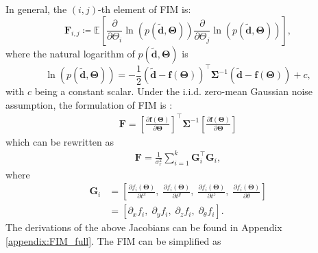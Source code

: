 \documentclass[journal]{IEEEtran}
\def\CovMatR{\mathbf{\Sigma}}
\def\StateVector{\mathbf{\Theta}}
\def\FIM{\mathbf{F}}
\begin{document}
In general, the $(i,j)$-th element of FIM is:
\begin{equation}
    \FIM_{i,j} \coloneqq \mathbb{E}\left[
    \frac{\partial}{\partial \Theta_i}\ln \left( p(\tilde{\mathbf{d}}, \StateVector) \right)
    \frac{\partial}{\partial \Theta_j}\ln \left( p(\tilde{\mathbf{d}}, \StateVector) \right)
    \right],
\end{equation}
where the natural logarithm of $p(\tilde{\mathbf{d}}, \StateVector)$ is \begin{equation}
    \ln \left( p(\tilde{\mathbf{d}}, \StateVector) \right) = - \frac{1}{2} (\tilde{\mathbf{d}} - \mathbf{f}(\StateVector))^\top \CovMatR^{-1} (\tilde{\mathbf{d}} - \mathbf{f}(\StateVector)) + c,
\end{equation}
with $c$ being a constant scalar. Under the i.i.d. zero-mean Gaussian noise assumption, the formulation of FIM is \cite{zekavat2011handbook}:
\begin{equation}
\begin{aligned}
    \FIM = 
    \left[ \frac{\partial \mathbf{f}(\StateVector)}{\partial \StateVector} \right]^\top 
    \CovMatR^{-1} 
    \left[ \frac{\partial \mathbf{f}(\StateVector)}{\partial \StateVector} \right]
\end{aligned}
\end{equation}
which can be rewritten as
{\color{black}
\begin{equation}
\begin{aligned}
    \FIM = 
    \frac{1}{\sigma_r^2}
    \sum\limits_{i=1}^{k}
    \mathbf{G}_i^\top \mathbf{G}_i,
\end{aligned}
\end{equation}
}
where%
\begin{equation} \label{eq:G_i_orginial}
\begin{aligned}
    \mathbf{G}_i &= \left[
        \frac{\partial f_i(\StateVector)}{\partial t^x}, \;
        \frac{\partial f_i(\StateVector)}{\partial t^y}, \;
        \frac{\partial f_i(\StateVector)}{\partial t^z}, \;
        \frac{\partial f_i(\StateVector)}{\partial \theta}
    \right] \\
    &= \left[
        \partial_x f_i, \; 
        \partial_y f_i, \;
        \partial_z f_i, \;
        \partial_{\theta} f_i
    \right].
\end{aligned}
\end{equation}
The derivations of the above Jacobians can be found in Appendix \ref{appendix:FIM_full}.
The FIM can be simplified as
\end{document}
